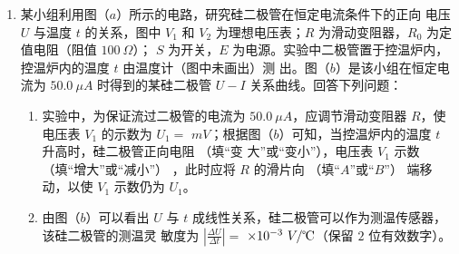 

\begin{enumerate}
\item
{}
某小组利用图（$ a $）所示的电路，研究硅二极管在恒定电流条件下的正向
电压 $ U $ 与温度 $ t $ 的关系，图中 $ V_{1} $ 和 $ V_{2} $ 为理想电压表；$ R $ 为滑动变阻器，$ R_{0} $ 为定值电阻（阻值 $ 100 \ \Omega $）；
$ S $ 为开关，$ E $ 为电源。实验中二极管置于控温炉内，控温炉内的温度 $ t $ 由温度计（图中未画出）测
出。图（$ b $）是该小组在恒定电流为 $ 50.0 \ \mu A $ 时得到的某硅二极管 $ U-I $ 关系曲线。回答下列问题：
\begin{figure}[h!]
\centering
\begin{subfigure}{0.4\linewidth}
\centering
 
\caption{}\label{}
\end{subfigure}
\begin{subfigure}{0.4\linewidth}
\centering
 
\caption{}\label{}
\end{subfigure}
\end{figure}

\begin{enumerate}
\item
实验中，为保证流过二极管的电流为 $ 50.0 \ \mu A $，应调节滑动变阻器 $ R $，使电压表 $ V_{1} $ 的示数为
$ U_{1} =$ \underlinegap $mV $；根据图（$ b $）可知，当控温炉内的温度 $ t $ 升高时，硅二极管正向电阻 \underlinegap （填“变
大”或“变小”），电压表 $ V_{1} $ 示数 \underlinegap （填“增大”或“减小”）
，此时应将 $ R $ 的滑片向 \underlinegap （填“$ A $”或“$ B $”）
端移动，以使 $ V_{1} $ 示数仍为 $ U_{1} $。

\item 
由图（$ b $）可以看出 $ U $ 与 $ t $ 成线性关系，硅二极管可以作为测温传感器，该硅二极管的测温灵
敏度为 $\left|\frac{\Delta U}{\Delta t}\right|=$ \underlinegap $ \times 10^{-3} \ V / \celsius $（保留 $ 2 $ 位有效数字）。





\end{enumerate}
\end{enumerate}
